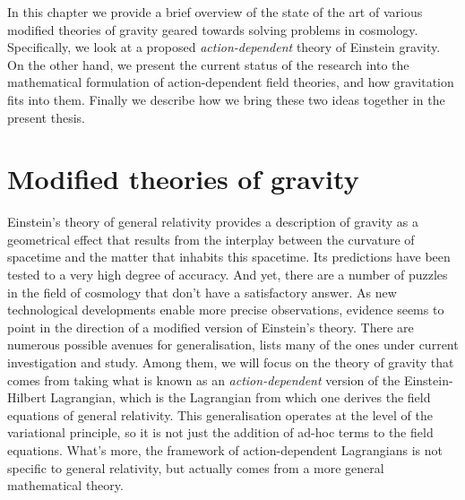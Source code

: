 \documentclass[../main.tex]{subfiles}
\begin{document}
In this chapter we provide a brief overview of the state of the art of various modified
theories of gravity geared towards solving problems in cosmology. Specifically, we look at
a proposed \emph{action-dependent} theory of Einstein gravity. On the other hand, we
present the current status of the research into the mathematical formulation of
action-dependent field theories, and how gravitation fits into them. Finally we describe
how we bring these two ideas together in the present thesis. 

\section{Modified theories of gravity}
Einstein's theory of general relativity provides a description of gravity as a geometrical
effect that results from the interplay between the curvature of spacetime and the matter
that inhabits this spacetime. Its predictions have been tested to a very high degree of
accuracy. And yet, there are a number of puzzles in the field of cosmology that don't have
a satisfactory answer. As new technological developments enable more precise observations,
evidence seems to point in the direction of a modified version of Einstein's theory. There
are numerous possible avenues for generalisation, \cite{Olmo2020} lists many of the ones
under current investigation and study. Among them, we will focus on the theory of gravity
that comes from taking what is known as an \emph{action-dependent} version of the
Einstein-Hilbert Lagrangian, which is the Lagrangian from which one derives the field
equations of general relativity. This generalisation operates at the level of the
variational principle, so it is not just the addition of ad-hoc terms to the field
equations. What's more, the framework of action-dependent Lagrangians is not specific to
general relativity, but actually comes from a more general mathematical theory.
\end{document}
